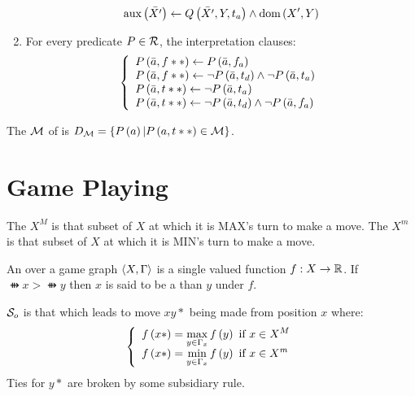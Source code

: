 \begin{defi}
\begin{enumerate}
\begin{equation}
{\ensuremath{\mbox{aux}\left(\bar{X'}\right)}\leftarrow\ensuremath{Q\left(\bar{X'},Y,t_a\right)}\wedge\ensuremath{\mbox{dom}\left(X',Y\right)}}
\end{equation}
\item For every predicate $P\in\mathcal{R}$, the interpretation clauses:
\begin{equation}
\left\{\begin{array}{l}P\left(\bar{a},f**\right)\leftarrow P\left(\bar{a},f_a\right)\\
P\left(\bar{a},f**\right)\leftarrow\neg P\left(\bar{a},t_d\right)\wedge\neg P\left(\bar{a},t_a\right)\\
P\left(\bar{a},t**\right)\leftarrow\neg P\left(\bar{a},t_a\right)\\
P\left(\bar{a},t**\right)\leftarrow\neg P\left(\bar{a},t_d\right)\wedge\neg P\left(\bar{a},f_a\right)\\
\end{array}\right.
\end{equation}
\end{enumerate}
\cite{conf/ijcai/BravoB03}
\end{defi}

\begin{defi}
The  $\mathcal{M}$ of  is $D_{\mathcal{M}}=\left\{ P\left(a\right)|P\left(a,t**\right)\in\mathcal{M}\right\}$.
\cite{conf/ijcai/BravoB03}
\end{defi}

\section{Game Playing}

\begin{defi}
The  $X^M$ is that subset of $X$ at which it is MAX's turn to make a move. The  $X^m$ is that subset of $X$ at which it is MIN's turn to make a move.
\cite{conf/ijcai/Boffey73}
\end{defi}

\begin{defi}
An  over a game graph $\left\langle X,\Gamma\right\rangle$ is a single valued function $f:X \rightarrow \mathbb{R}$. If $\ffun{x}>\ffun{y}$ then $x$ is said to be a  than $y$ under $f$.
\cite{conf/ijcai/Boffey73}
\end{defi}

\begin{defi}
$\mathcal{S}_o$ is that  which leads to move $xy*$ being made from position $x$ where:
\begin{equation}
\left\{\begin{array}{l}f\left(x*\right)=\displaystyle\max_{y\in\Gamma_x}f\left(y\right)\mbox{ if }x\in X^M\\
f\left(x*\right)=\displaystyle\min_{y\in\Gamma_x}f\left(y\right)\mbox{ if }x\in X^m\end{array}\right.
\end{equation}
Ties for $y*$ are broken by some subsidiary rule.
\cite{conf/ijcai/Boffey73}
\end{defi}

